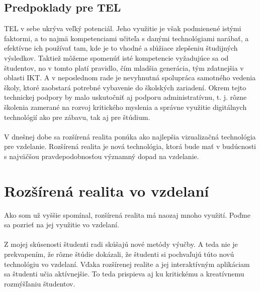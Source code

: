 \documentclass[10pt,oneside,slovak,a4paper]{article}
\begin{document}
\subsection{Predpoklady pre TEL} \label{tel:predpoklady}
TEL v sebe ukrýva veľký potenciál.\cite{Daniela2018}  
Jeho využitie je však podmienené istými faktormi, a to najmä kompetenciami učiteľa s danými technológiami narábať, a efektívne ich používať tam, kde je to vhodné a slúžiace zlepšeniu študijných výsledkov.
Taktiež môžeme spomenúť isté kompetencie vyžadujúce sa od študentov, no v tomto platí pravidlo, čím mladšia generácia, tým zdatnejšia v oblasti IKT. 
A v neposlednom rade je nevyhnutná spolupráca samotného vedenia školy, ktoré zaobstará potrebné vybavenie do školských zariadení. 
Okrem tejto technickej podpory by malo uskutočniť aj podporu administratívnu, t. j. rôzne školenia zamerané na rozvoj kritického myslenia a správne využitie digitálnych technológií ako pre zábavu, tak aj pre štúdium.
\\\\V dnešnej dobe sa rozšírená realita ponúka ako najlepšia vizualizačná technológia pre vzdelanie.
Rozšírená realita je nová technológia, ktorá bude mať v budúcnosti s najväčšou pravdepodobnosťou významný dopad na vzdelanie.\cite{Saidin2015} 
\section{Rozšírená realita vo vzdelaní} \label{rozsirenaVzdelanie}
Ako som už vyššie spomínal, rozšírená realita má naozaj mnoho využití. 
Poďme sa pozrieť na jej využitie vo vzdelaní.\\\\
Z mojej skúsenosti študenti radi skúšajú nové metódy výučby.
A teda nie je prekvapením, že rôzne štúdie dokázali, že študenti si pochvaľujú túto novú technológiu vo vzdelaní.\cite{Saidin2015}
Vďaka rozšírenej realite a jej interaktívným aplikáciam sa študenti učia aktívnejšie.
To teda prispieva aj ku kritickému a kreatívnemu rozmýšľaniu študentov.
\end{document}
